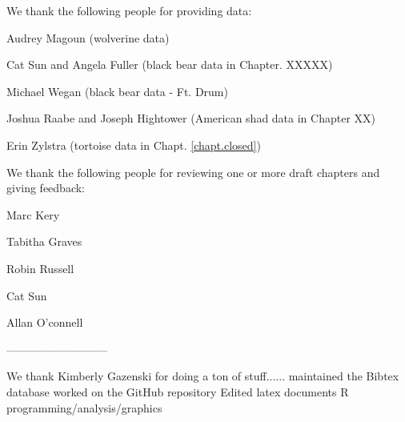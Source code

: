 We thank the following people for providing data:



Audrey Magoun (wolverine data)

Cat Sun and Angela Fuller (black bear data in Chapter. XXXXX)

Michael Wegan (black bear data - Ft. Drum)

Joshua Raabe and Joseph Hightower (American shad data in Chapter XX)

Erin Zylstra (tortoise data in Chapt. \ref{chapt.closed})


We thank the following people for reviewing one or more draft chapters
and giving feedback:

Marc Kery

Tabitha Graves

Robin Russell

Cat Sun

Allan O'connell

---------------------------

We thank Kimberly Gazenski for doing a ton of stuff......
maintained the Bibtex database
worked on the GitHub repository
Edited latex documents
R programming/analysis/graphics


